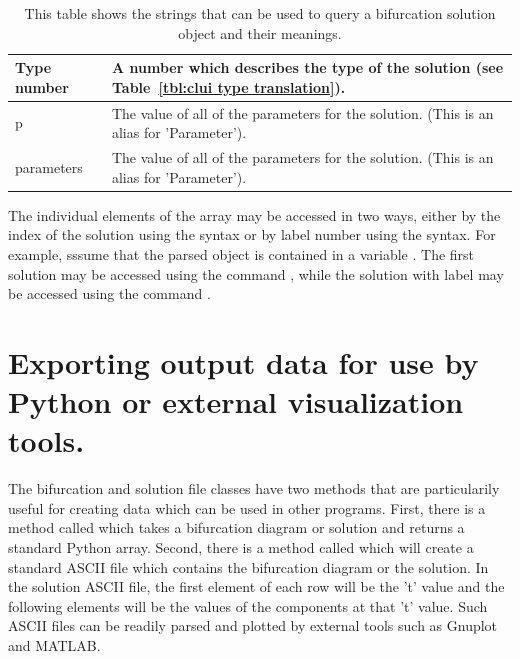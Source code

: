 \documentclass[12pt]{report}
\begin{document}
\begin{table}[htbp]
\begin{center}
\begin{tabular}{| l | l |}
 \hline
 Type number & \begin{minipage}{4in} \smallskip A number which describes the type of the solution (see Table~\ref{tbl:clui type translation}).  \smallskip \end{minipage} \\  
 \hline
 p & \begin{minipage}{4in} \smallskip The value of all of the parameters for the solution. (This is an alias for 'Parameter'). \smallskip \end{minipage} \\  
 \hline
 parameters & \begin{minipage}{4in} \smallskip The value of all of the parameters for the solution. (This is an alias for 'Parameter').\smallskip \end{minipage} \\  
 \hline
 \end{tabular}
 \caption[Contents of a bifurcation solution object.]
 {This table shows the strings that can be used to
 query a bifurcation solution object and their
 meanings.}
 \label{tbl:clui parse solution}
 \end{center}
 \end{table}

 The individual elements of the array may be accessed 
 in two ways, either by the index of the solution using the
 \commandf{[]} syntax or by label number using the
 \commandf{()} syntax.  For example, sssume that the parsed object is contained
 in a variable .  
 The first solution may be accessed 
 using the command , while the solution with
 label  may be accessed using the command .

 \section{Exporting output data for use by Python or external
   visualization tools.} \label{sec:clui_exporting}

 The bifurcation and solution file classes have two methods that are 
 particularily useful for creating data which can be used in other
 programs.  First, there is a method called  which
 takes a bifurcation diagram or solution and
 returns a standard Python array.  Second, there is a method called
  which will create a standard ASCII file
 which contains the bifurcation diagram or the solution. 
 In the solution ASCII file, the first element of each row will be
 the 't' value and the following elements will be the
 values of the components at that 't' value. Such ASCII files
 can be readily parsed and plotted by external tools such as
 Gnuplot and MATLAB.
\end{document}
